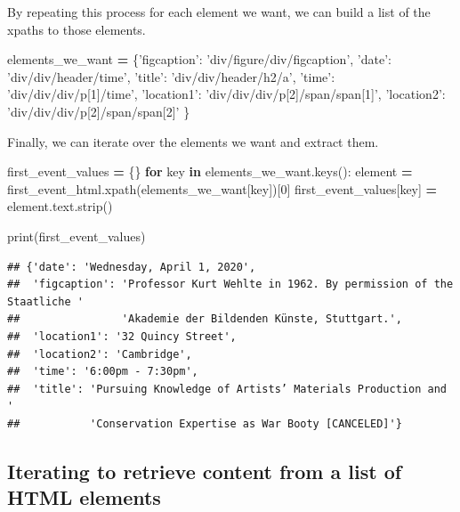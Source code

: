 \documentclass[]{book}
\newenvironment{Shaded}{\begin{snugshade}}{\end{snugshade}}
\newcommand{\BuiltInTok}[1]{#1}
\newcommand{\ControlFlowTok}[1]{\textcolor[rgb]{0.13,0.29,0.53}{\textbf{#1}}}
\newcommand{\DecValTok}[1]{\textcolor[rgb]{0.00,0.00,0.81}{#1}}
\newcommand{\KeywordTok}[1]{\textcolor[rgb]{0.13,0.29,0.53}{\textbf{#1}}}
\newcommand{\NormalTok}[1]{#1}
\newcommand{\OperatorTok}[1]{\textcolor[rgb]{0.81,0.36,0.00}{\textbf{#1}}}
\newcommand{\StringTok}[1]{\textcolor[rgb]{0.31,0.60,0.02}{#1}}
\begin{document}
By repeating this process for each element we want, we can build a list of the xpaths to those elements.

\begin{Shaded}
\begin{Highlighting}[]
\NormalTok{elements_we_want }\OperatorTok{=}\NormalTok{ \{}\StringTok{'figcaption'}\NormalTok{: }\StringTok{'div/figure/div/figcaption'}\NormalTok{,}
                    \StringTok{'date'}\NormalTok{: }\StringTok{'div/div/header/time'}\NormalTok{,}
                    \StringTok{'title'}\NormalTok{: }\StringTok{'div/div/header/h2/a'}\NormalTok{,}
                    \StringTok{'time'}\NormalTok{: }\StringTok{'div/div/div/p[1]/time'}\NormalTok{,}
                    \StringTok{'location1'}\NormalTok{: }\StringTok{'div/div/div/p[2]/span/span[1]'}\NormalTok{,}
                    \StringTok{'location2'}\NormalTok{: }\StringTok{'div/div/div/p[2]/span/span[2]'}
\NormalTok{                    \}}
\end{Highlighting}
\end{Shaded}

Finally, we can iterate over the elements we want and extract them.

\begin{Shaded}
\begin{Highlighting}[]
\NormalTok{first_event_values }\OperatorTok{=}\NormalTok{ \{\}}
\ControlFlowTok{for}\NormalTok{ key }\KeywordTok{in}\NormalTok{ elements_we_want.keys():}
\NormalTok{    element }\OperatorTok{=}\NormalTok{ first_event_html.xpath(elements_we_want[key])[}\DecValTok{0}\NormalTok{]}
\NormalTok{    first_event_values[key] }\OperatorTok{=}\NormalTok{ element.text.strip()}

\BuiltInTok{print}\NormalTok{(first_event_values)}
\end{Highlighting}
\end{Shaded}

\begin{verbatim}
## {'date': 'Wednesday, April 1, 2020',
##  'figcaption': 'Professor Kurt Wehlte in 1962. By permission of the Staatliche '
##                'Akademie der Bildenden Künste, Stuttgart.',
##  'location1': '32 Quincy Street',
##  'location2': 'Cambridge',
##  'time': '6:00pm - 7:30pm',
##  'title': 'Pursuing Knowledge of Artists’ Materials Production and '
##           'Conservation Expertise as War Booty [CANCELED]'}
\end{verbatim}

\hypertarget{iterating-to-retrieve-content-from-a-list-of-html-elements}{%
\subsection{Iterating to retrieve content from a list of HTML elements}\label{iterating-to-retrieve-content-from-a-list-of-html-elements}}
\end{document}
